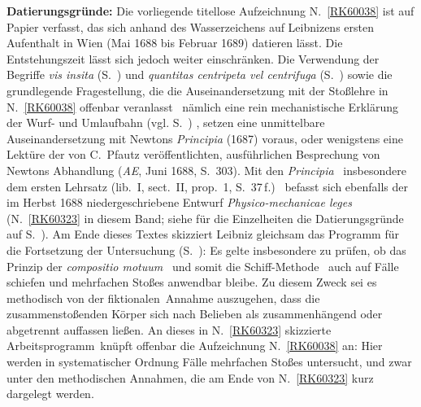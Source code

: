 \begin{ledgroup}
\footnotesize
\pstart
\noindent%
\textbf{Datierungsgründe:}
Die vorliegende titellose Aufzeichnung N.~\ref{RK60038} ist auf Papier verfasst, das sich anhand des Wasserzeichens auf Leibnizens ersten Aufenthalt in Wien (Mai 1688 bis Februar 1689) datieren lässt.
Die Entstehungszeit lässt sich jedoch weiter einschränken.
Die Verwendung der Begriffe \textit{vis insita} (S.~) und \textit{quantitas centripeta vel centrifuga} (S.~) sowie die grundlegende Fragestellung, die die Auseinandersetzung mit der Stoßlehre in N.~\ref{RK60038} offenbar veranlasst \textendash\ nämlich eine rein mechanistische Erklärung der Wurf- und Umlaufbahn (vgl. S.~) \textendash, setzen eine unmittelbare Auseinandersetzung mit
\protect{}%
Newtons \textit{Principia} (1687)\cite{00535} voraus,
oder wenigstens eine Lektüre der von C.~Pfautz%
\protect{}
veröffentlichten, ausführlichen Besprechung von Newtons Abhandlung (\textit{AE}, Juni 1688, S.~303).\cite{01356}
Mit den \textit{Principia} \textendash\ insbesondere dem ersten Lehrsatz (lib.~I, sect.~II, prop.~1, S.~37\,f.)\cite{00535} \textendash\ befasst sich ebenfalls der im Herbst 1688 niedergeschriebene Entwurf \textit{Physico-mechanicae leges} (N.~\ref{RK60323} in diesem Band; siehe für die Einzelheiten die Datierungsgründe auf S.~\pageref{LH_37_05_104-105_datierung}).
Am Ende dieses Textes skizziert Leibniz gleichsam das Programm für die Fortsetzung der Untersuchung (S.~):
Es gelte insbesondere zu prüfen, ob das Prinzip der \textit{compositio motuum} \textendash\ und somit die \glqq Schiff\grqq-Methode \textendash\ auch auf Fälle schiefen und mehrfachen Stoßes anwendbar bleibe.
Zu diesem Zweck sei es methodisch von der \glqq fiktionalen\grqq\ Annahme auszugehen, dass die zusammenstoßenden Körper sich nach Belieben als zusammenhängend oder abgetrennt auffassen ließen.
%
An dieses in N.~\ref{RK60323} skizzierte \glqq Arbeitsprogramm\grqq\ knüpft offenbar die Aufzeichnung N.~\ref{RK60038} an:
Hier werden in systematischer Ordnung Fälle mehrfachen Stoßes untersucht, und zwar unter den methodischen Annahmen, die am Ende von N.~\ref{RK60323} kurz dargelegt werden.%

\end{ledgroup}
